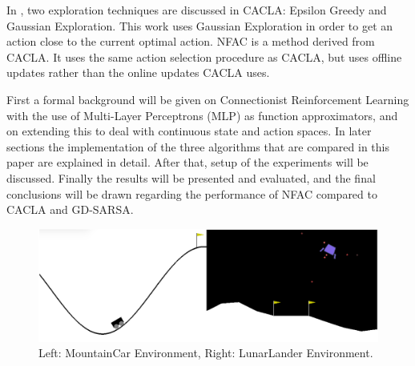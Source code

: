 In \cite{van2007reinforcement}, two exploration techniques are discussed in CACLA: Epsilon Greedy and Gaussian Exploration. This work uses Gaussian Exploration in order to get an action close to the current optimal action. NFAC \cite{zimmer2016neural} is a method derived from CACLA. It uses the same action selection procedure as CACLA, but uses offline updates rather than the online updates CACLA uses. 



First a formal background will be given on Connectionist Reinforcement Learning with the use of Multi-Layer Perceptrons (MLP) as function approximators, and on extending this to deal with continuous state and action spaces. In later sections the implementation of the three algorithms that are compared in this paper are explained in detail. After that, setup of the experiments will be discussed. Finally the results will be presented and evaluated, and the final conclusions will be drawn regarding the performance of NFAC compared to CACLA and GD-SARSA.

\begin{figure}[t]
 \centering 
    \includegraphics[width = 0.7\columnwidth]{figs/mountainlunar.png}
 \caption{Left: MountainCar Environment, Right: LunarLander Environment.}
\label{fig:mountainlunar}
\end{figure}
